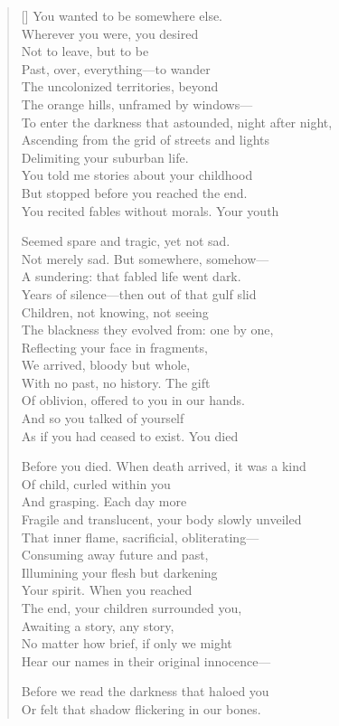 \settowidth{\versewidth}{To enter the darkness that astounded, night after night,}
\begin{verse}[\versewidth]
You wanted to be somewhere else.\\
Wherever you were, you desired\\
Not to leave, but to be\\
Past, over, everything---to wander\\
The uncolonized territories, beyond \\
The orange hills, unframed by windows---\\
To enter the darkness that astounded, night after night,\\
Ascending from the grid of streets and lights\\
Delimiting your suburban life.\\
You told me stories about your childhood\\
But stopped before you reached the end.\\
You recited fables without morals.  Your youth

Seemed spare and tragic, yet not sad.\\
Not merely sad.  But somewhere, somehow---\\
A sundering: that fabled life went dark.\\
Years of silence---then out of that gulf slid\\
Children, not knowing, not seeing\\
The blackness they evolved from: one by one,\\
Reflecting your face in fragments,\\
We arrived, bloody but whole,\\
With no past, no history.  The gift\\
Of oblivion, offered to you in our hands.\\
And so you talked of yourself\\
As if you had ceased to exist.	You died

Before you died.   When death arrived, it was a kind\\
Of child, curled within you\\
And grasping.   Each day more\\
Fragile and translucent, your body slowly unveiled\\
That inner flame, sacrificial, obliterating---\\
Consuming away future and past, \\
Illumining your flesh but darkening\\
Your spirit. When you reached\\
The end, your children surrounded you,\\
Awaiting a story, any story,\\
No matter how brief, if only we might\\
Hear our names in their original innocence---

Before we read the darkness that haloed you\\
Or felt that shadow flickering in our bones.
\end{verse}
